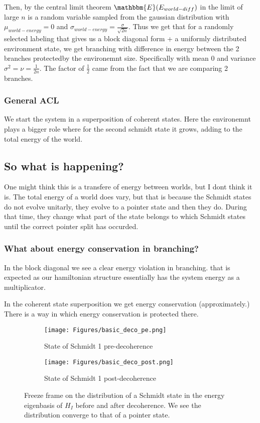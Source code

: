 \documentclass{article}
\begin{document}
Then, by the central limit theorem $\mathbbm{E}(E_{world-diff})$ in the limit of large $n$ is a random variable sampled from the gaussian distribution with $\mu_{world-energy}=0$ and $\sigma_{world-energy}=\frac{\sigma}{\sqrt{2n}}$.
Thus we get that for a randomly selected labeling that gives us a block diagonal form + a uniformly distributed environment state, we get branching with difference in energy between the 2 branches protectedby the environemnt size. Specifically with mean 0 and variance $\sigma^2=\nu=\frac{1}{2n}$. The factor of $\frac{1}{2}$ came from the fact that we are comparing 2 branches.

\subsubsection{General ACL}

We start the system in a superposition of coherent states. Here the environemnt plays a bigger role where for the second schmidt state it grows, adding to the total energy of the world. 

\subsection{So what is happening?}

One might think this is a transfere of energy between worlds, but I dont think it is.
The total energy of a world does vary, but that is because the Schmidt states do not evolve unitarly, they evolve to a pointer state and then they do. During that time, they change what part of the state belongs to which Schmidt states until the correct pointer split has occurded. 

\subsubsection{What about energy conservation in branching?}

In the block diagonal we see a clear energy violation in branching. that is expected as our hamiltonian structure essentially has the system energy as a multiplicator. 

In the coherent state superposition we get energy conservation (approximately.) There is a way in which energy conservation is protected there.

\begin{figure}[h!]
  \centering
  \begin{subfigure}[b]{0.49\linewidth}
    \texttt{[image: Figures/basic\_deco\_pe.png]}
    \label{fig:1}
    \caption{State of Schmidt 1 pre-decoherence}
  \end{subfigure}
  \begin{subfigure}[b]{0.49\linewidth}
    \texttt{[image: Figures/basic\_deco\_post.png]}
    \label{fig:2}
    \caption{State of Schmidt 1 post-decoherence}
  \end{subfigure}
  \caption{}
  \label{fig:dist_EI_dep}
  \caption{Freeze frame on the distribution of a Schmidt state in the energy eigenbasis of $H_I$ before and after decoherence. We see the distribution converge to that of a pointer state.}
\end{figure}
\end{document}

